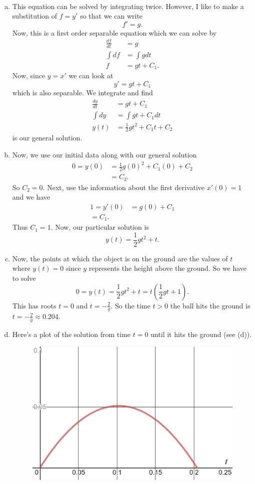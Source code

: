 \documentclass[12pt]{article} %
\begin{document}
\begin{solution}~
\begin{enumerate}[(a)]
    \item This equation can be solved by integrating twice.  However, I like to make a substitution of $f=y'$ so that we can write
    \[
    f'=g.
    \]
    Now, this is a first order separable equation which we can solve by
    \begin{align*}
        \frac{df}{dt}&=g\\
        \int df&= \int gdt\\
        f&= gt+C_1.
    \end{align*}
    Now, since $y=x'$ we can look at
    \[
    y'=gt+C_1
    \]
    which is also separable.  We integrate and find
    \begin{align*}
        \frac{dy}{dt}&=gt+C_1\\
        \int dy &= \int gt+C_1 dt\\
        y(t)&= \frac{1}{2}gt^2+C_1t+C_2
    \end{align*}
    is our general solution.
    \item Now, we use our initial data along with our general solution
    \begin{align*}
        0=y(0)&=\frac{1}{2}g(0)^2+C_1(0)+C_2\\
        &=C_2.
    \end{align*}
    So $C_2=0$. Next, use the information about the first derivative $x'(0)=1$ and we have
    \begin{align*}
        1=y'(0)&=g(0)+C_1\\
        =C_1.
    \end{align*}
    Thus $C_1=1$. Now, our particular solution is
    \[
    \boxed{y(t)=\frac{1}{2}gt^2+t.}
    \]
    \item Now, the points at which the object is on the ground are the values of $t$ where $y(t)=0$ since $y$ represents the height above the ground.  So we have to solve
    \[
    0=y(t)=\frac{1}{2}gt^2+t=t\left(\frac{1}{2}gt+1\right).
    \]
    This has roots $t=0$ and $t=-\frac{2}{g}$.  So the time $t>0$ the ball hits the ground is $t=-\frac{2}{g} \approx 0.204$.
    \item Here's a plot of the solution from time $t=0$ until it hits the ground (see (d)).
    \begin{figure}[H]
        \centering
        \includegraphics[width=\textwidth]{projectile.png}

\end{figure}
\end{enumerate}
\end{solution}
\end{document}
